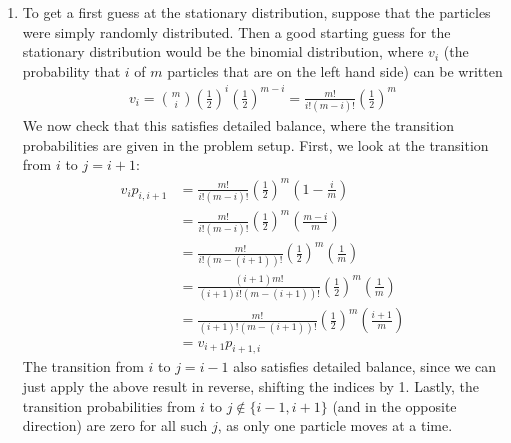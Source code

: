 \documentclass[12pt]{article}
\theoremstyle{plain}
\theoremstyle{definition}
\theoremstyle{remark}
\begin{document}
\begin{enumerate}
\item %
  To get a first guess at the stationary distribution, suppose that the
  particles were simply randomly distributed. Then a good starting guess
  for the stationary distribution would be the binomial distribution,
  where $v_i$ (the probability that $i$ of $m$ particles that are on the
  left hand side) can be written
  \begin{align}
    v_i = \binom{m}{i} \left(\frac{1}{2}\right)^i
      \left(\frac{1}{2}\right)^{m-i} =
      \frac{m!}{i!(m-i)!} \left(\frac{1}{2}\right)^m
      \label{q3.v}
  \end{align}
  We now check that this satisfies detailed balance, where the
  transition probabilities are given in the problem setup. First, we
  look at the transition from $i$ to $j=i+1$:
  \begin{align*}
    v_i p_{i,i+1}
      &= \frac{m!}{i!(m-i)!} \left(\frac{1}{2}\right)^m
        \left(1-\frac{i}{m}\right)\\
      &= \frac{m!}{i!(m-i)!} \left(\frac{1}{2}\right)^m
        \left(\frac{m-i}{m}\right)\\
      &= \frac{m!}{i!(m-(i+1))!} \left(\frac{1}{2}\right)^m
        \left(\frac{1}{m}\right)\\
      &= \frac{(i+1)m!}{(i+1)i!(m-(i+1))!} \left(\frac{1}{2}\right)^m
        \left(\frac{1}{m}\right)\\
      &= \frac{m!}{(i+1)!(m-(i+1))!} \left(\frac{1}{2}\right)^m
        \left(\frac{i+1}{m}\right)\\
      &= v_{i+1} p_{i+1,i}
  \end{align*}
  The transition from $i$ to $j=i-1$ also satisfies detailed balance,
  since we can just apply the above result in reverse, shifting the
  indices by 1. Lastly, the transition probabilities from $i$ to
  $j\not\in\{i-1,i+1\}$ (and in the opposite direction) are zero for all
  such $j$, as only one particle moves at a time.

%


\end{enumerate}
\end{document}
